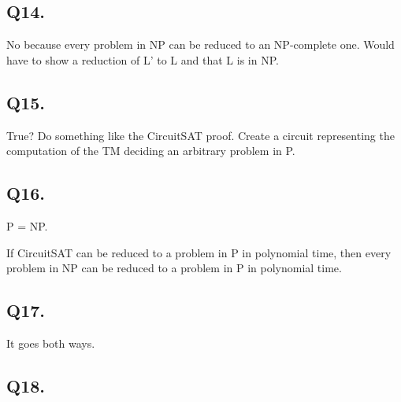 \documentclass[letterpaper]{article}
\begin{document}
\subsection*{Q14.}

No because every problem in NP can be reduced to an NP-complete one.
Would have to show a reduction of L' to L and that L is in NP.

\subsection*{Q15.}

True? Do something like the CircuitSAT proof. Create a circuit
representing the computation of the TM deciding an arbitrary
problem in P.

\subsection*{Q16.}

P = NP.

If CircuitSAT can be reduced to a problem in P in polynomial time,
then every problem in NP can be reduced to a problem in P in polynomial time.

\subsection*{Q17.}

It goes both ways.

\subsection*{Q18.}
\end{document}
